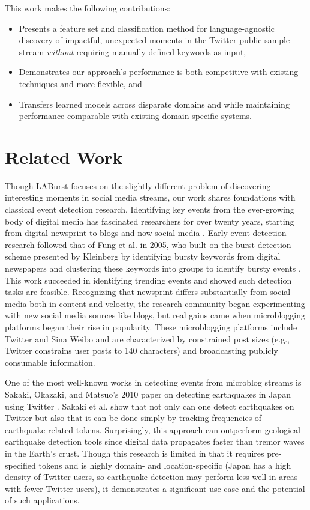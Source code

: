 \documentclass[letterpaper]{article}
\begin{document}
This work makes the following contributions:
%
\begin{itemize}
\item Presents a feature set and classification method for language-agnostic discovery of impactful, unexpected moments in the Twitter public sample stream {\it without} requiring manually-defined keywords as input,

\item Demonstrates our approach's performance is both competitive with existing techniques and more flexible, and

\item Transfers learned models across disparate domains and while maintaining performance comparable with existing domain-specific systems.
\end{itemize}

\section{Related Work}
\label{sect:relatedWork}

Though LABurst focuses on the slightly different problem of discovering interesting moments in social media streams, our work shares foundations with classical event detection research.
Identifying key events from the ever-growing body of digital media has fascinated researchers for over twenty years, starting from digital newsprint to blogs and now social media \cite{allan1998line}.
Early event detection research followed that of Fung et al. in 2005, who built on the burst detection scheme presented by Kleinberg by identifying bursty keywords from digital newspapers and clustering these keywords into groups to identify bursty events \cite{Kleinberg:2002:BHS:775047.775061,Fung:2005:PFB:1083592.1083616}.
This work succeeded in identifying trending events and showed such detection tasks are feasible.
Recognizing that newsprint differs substantially from social media both in content and velocity, the research community began experimenting with new social media sources like blogs, but real gains came when microblogging platforms began their rise in popularity.
These microblogging platforms include Twitter and Sina Weibo and are characterized by constrained post sizes (e.g., Twitter constrains user posts to 140 characters) and broadcasting publicly consumable information.

One of the most well-known works in detecting events from microblog streams is Sakaki, Okazaki, and Matsuo's 2010 paper on detecting earthquakes in Japan using Twitter \cite{Sakaki:2010:EST:1772690.1772777}.
Sakaki et al. show that not only can one detect earthquakes on Twitter but also that it can be done simply by tracking frequencies of earthquake-related tokens.
Surprisingly, this approach can outperform geological earthquake detection tools since digital data propagates faster than tremor waves in the Earth's crust.
Though this research is limited in that it requires pre-specified tokens and is highly domain- and location-specific (Japan has a high density of Twitter users, so earthquake detection may perform less well in areas with fewer Twitter users), it demonstrates a significant use case and the potential of such applications.
\end{document}
